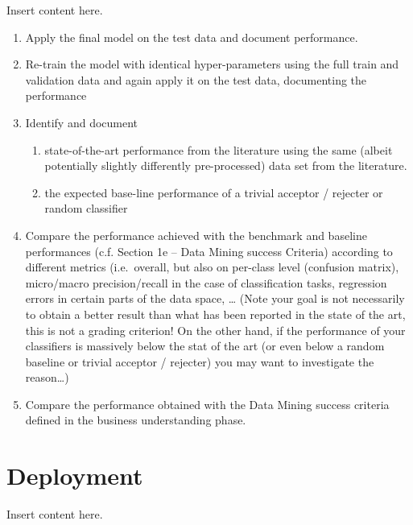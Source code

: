 \documentclass[sigchi]{acmart}
\def\tightlist{}
\begin{document}
Insert content here.

\begin{enumerate}
\def\labelenumi{\alph{enumi}.}
\tightlist
\item
  Apply the final model on the test data and document performance.
\item
  Re-train the model with identical hyper-parameters using the full train and validation data and again apply it on the test data, documenting the performance
\item
  Identify and document

  \begin{enumerate}
  \def\labelenumii{\roman{enumii}.}
  \tightlist
  \item
    state-of-the-art performance from the literature using the same (albeit potentially slightly differently pre-processed) data set from the literature.
  \item
    the expected base-line performance of a trivial acceptor / rejecter or random classifier
  \end{enumerate}
\item
  Compare the performance achieved with the benchmark and baseline performances (c.f. Section 1e -- Data Mining success Criteria) according to different metrics (i.e.~overall, but also on per-class level (confusion matrix), micro/macro precision/recall in the case of classification tasks, regression errors in certain parts of the data space, \ldots{} (Note your goal is not necessarily to obtain a better result than what has been reported in the state of the art, this is not a grading criterion! On the other hand, if the performance of your classifiers is massively below the stat of the art (or even below a random baseline or trivial acceptor / rejecter) you may want to investigate the reason\ldots)
\item
  Compare the performance obtained with the Data Mining success criteria defined in the business understanding phase.
\end{enumerate}

\hypertarget{deployment}{%
\section{Deployment}\label{deployment}}

Insert content here.
\end{document}
